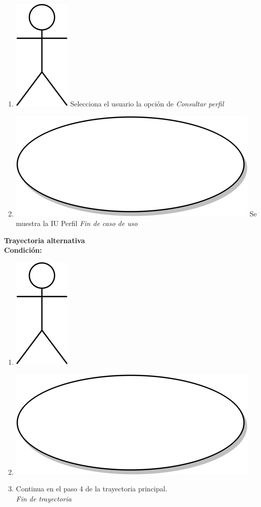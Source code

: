 \begin{enumerate}
\item {\includegraphics[scale=.1]{Capitulo3/img/actor.png} Selecciona el usuario la opción de \textit{Consultar perfil}}
\item {\includegraphics[scale=.05]{Capitulo3/img/proceso.png} Se muestra la IU Perfil}
  \textit{Fin de caso de uso} \\  
\end{enumerate}

\textbf{Trayectoria alternativa} \label{cu_ta_} \\
\textbf{Condición:} \\
 \begin{enumerate}[label=\arabic*]
    \item {\includegraphics[scale=.1]{Capitulo3/img/actor.png} }
    \item {\includegraphics[scale=.05]{Capitulo3/img/proceso.png}}
    \item {Continua en el paso 4 de la trayectoria principal.} \\
    \textit{Fin de trayectoria} \\
\end{enumerate}

